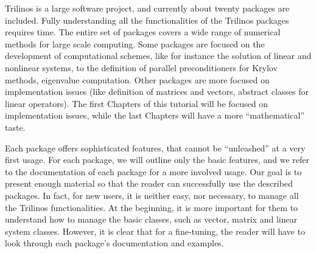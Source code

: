 \smallskip

Trilinos is a large software project, and currently about twenty
packages are included. Fully understanding all the functionalities of
the Trilinos packages requires time. The entire set of packages covers a
wide range of numerical methods for large scale computing. Some packages
are focused on the development of computational schemes, like for
instance the solution of linear and nonlinear systems, to the definition
of parallel preconditioners for Krylov methods, eigenvalue computation.
Other packages are more focused on implementation issues (like
definition of matrices and vectors, abstract classes for linear
operators). The first Chapters of this tutorial will be focused on
implementation issues, while the last Chapters will have a more
``mathematical'' taste.

Each package offers sophisticated features, that cannot be ``unleashed''
at a very first usage. For each package, we will outline only the basic
features, and we refer to the documentation of each package for a more
involved usage. Our goal is to present enough material so that the
reader can successfully use the described packages.  In fact, for new
users, it is neither easy, nor necessary, to manage all the Trilinos
functionalities. At the beginning, it is more important for them to
understand how to manage the basic classes, such as vector, matrix and
linear system classes. However, it is clear that for a fine-tuning, the
reader will have to look through each package's documentation and
examples.

\medskip

